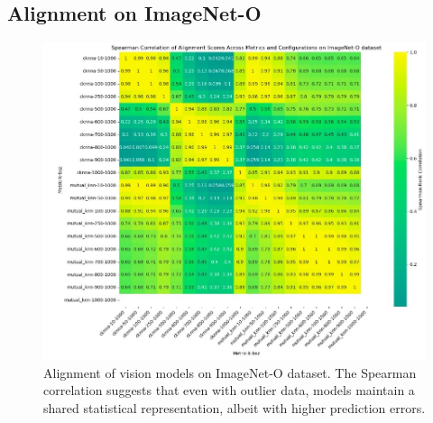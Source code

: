 \documentclass[10pt,a4paper]{article}
\begin{document}
\subsection{Alignment on ImageNet-O}
\begin{figure}[H]
    \centering
    \includegraphics[width=\textwidth]{prh_correlation_ood.jpg}
    \caption{Alignment of vision models on ImageNet-O dataset. The Spearman correlation suggests that even with outlier data, models maintain a shared statistical representation, albeit with higher prediction errors.}
    \label{fig:prh_correlation_ood}
\end{figure}
\end{document}

